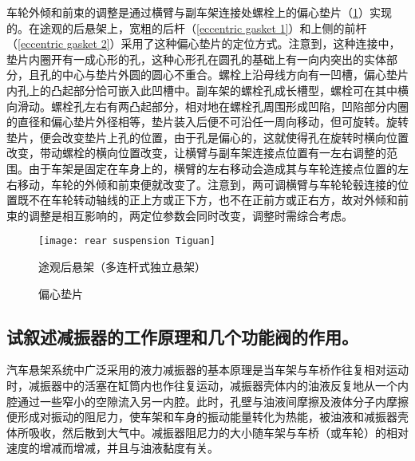 \documentclass[UTF8]{ctexart}
\numberwithin{figure}{section}
\numberwithin{table}{section}
\begin{document}
车轮外倾和前束的调整是通过横臂与副车架连接处螺栓上的偏心垫片（\cref{eccentric gasket}）实现的。在途观的后悬架上，宽粗的后杆（\cref{eccentric gasket 1}）和上侧的前杆（\cref{eccentric gasket 2}）采用了这种偏心垫片的定位方式。注意到，这种连接中，垫片内圈开有一成心形的孔，这种心形孔在圆孔的基础上有一向内突出的实体部分，且孔的中心与垫片外圆的圆心不重合。螺栓上沿母线方向有一凹槽，偏心垫片内孔上的凸起部分恰可嵌入此凹槽中。副车架的螺栓孔成长槽型，螺栓可在其中横向滑动。螺栓孔左右有两凸起部分，相对地在螺栓孔周围形成凹陷，凹陷部分内圈的直径和偏心垫片外径相等，垫片装入后便不可沿任一周向移动，但可旋转。旋转垫片，便会改变垫片上孔的位置，由于孔是偏心的，这就使得孔在旋转时横向位置改变，带动螺栓的横向位置改变，让横臂与副车架连接点位置有一左右调整的范围。由于车架是固定在车身上的，横臂的左右移动会造成其与车轮连接点位置的左右移动，车轮的外倾和前束便就改变了。注意到，两可调横臂与车轮轮毂连接的位置既不在车轮转动轴线的正上方或正下方，也不在正前方或正右方，故对外倾和前束的调整是相互影响的，两定位参数会同时改变，调整时需综合考虑。

\begin{figure}[htbp]
	\centering
	\begin{minipage}[b]{0.9\textwidth}
		\centering
		\texttt{[image: rear suspension Tiguan]}
		\caption{途观后悬架（多连杆式独立悬架）}
		\label{rear suspension Tiguan}
	\end{minipage}
	\begin{minipage}[b]{\textwidth}
		\centering
		\caption{偏心垫片}
		\label{eccentric gasket}
	\end{minipage}
\end{figure}

\subsection{试叙述减振器的工作原理和几个功能阀的作用。}

汽车悬架系统中广泛采用的液力减振器的基本原理是当车架与车桥作往复相对运动时，减振器中的活塞在缸筒内也作往复运动，减振器壳体内的油液反复地从一个内腔通过一些窄小的空隙流入另一内腔。此时，孔壁与油液间摩擦及液体分子内摩擦便形成对振动的阻尼力，使车架和车身的振动能量转化为热能，被油液和减振器壳体所吸收，然后散到大气中。减振器阻尼力的大小随车架与车桥（或车轮）的相对速度的增减而增减，并且与油液黏度有关。
\end{document}

